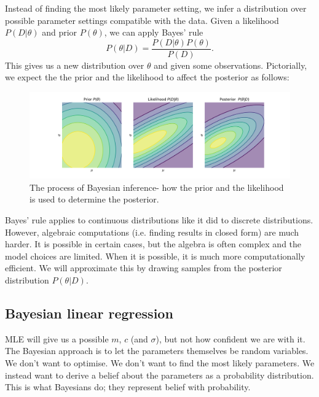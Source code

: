 \documentclass[a4paper, openany]{memoir}
\begin{document}
Instead of finding the most likely parameter setting, we infer a distribution over possible parameter settings compatible with the data. Given a likelihood $P(D|\theta)$ and prior $P(\theta)$, we can apply Bayes' rule
\[P(\theta|D) = \frac{P(D|\theta) P(\theta)}{P(D)}.\]
This gives us a new distribution over $\theta$ and given some observations. Pictorially, we expect the the prior and the likelihood to affect the posterior as follows:
\begin{figure}[H]
    \centering
    \includegraphics[scale=0.38]{src/5.29 bayesian_inference.png}
    \caption{The process of Bayesian inference- how the prior and the likelihood is used to determine the posterior.}
\end{figure}

Bayes' rule applies to continuous distributions like it did to discrete distributions. However, algebraic computations (i.e. finding results in closed form) are much harder. It is possible in certain cases, but the algebra is often complex and the model choices are limited. When it is possible, it is much more computationally efficient. We will approximate this by drawing samples from the posterior distribution $P(\theta|D)$.

\subsection{Bayesian linear regression}
MLE will give us a possible $m$, $c$ (and $\sigma$), but not how confident we are with it. The Bayesian approach is to let the parameters themselves be random variables. We don't want to optimise. We don't want to find the most likely parameters. We instead want to derive a belief about the parameters as a probability distribution. This is what Bayesians do; they represent belief with probability.
\end{document}
